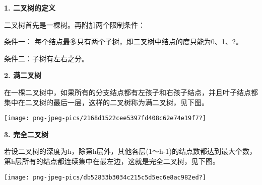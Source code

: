{\textbf{1. 二叉树的定义}}

{二叉树首先是一棵树。再附加两个限制条件：}

{{条件一：} 每个结点最多只有两个子树，即二叉树中结点的度只能为0、1、2。}

{{条件二：}子树有左右之分。}{}

{\textbf{2. 满二叉树}}

{在一棵二叉树中，{如果所有的分支结点都有左孩子和右孩子结点，并且叶子结点都集中在二叉树的最后一层}，这样的二叉树称为满二叉树，见下图。}

{\texttt{[image: png-jpeg-pics/2168d1522cee5397fd408c62e74e19f7?]}\\
\hspace*{0.333em}}

{\textbf{3. 完全二叉树}}

{若设二叉树的深度为h，除第h层外，其他各层(1～h-1)的结点数都达到最大个数，{第h层所有的结点都连续集中在最左边}，这就是完全二叉树，见下图。}

{}

\texttt{[image: png-jpeg-pics/db52833b3034c215c5d5ec6e8ac982ed?]}
